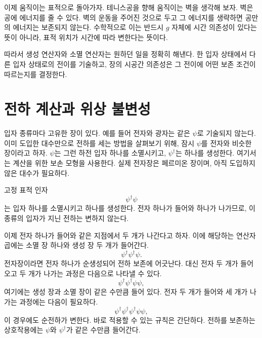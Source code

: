 \begin{classroomqa}
\end{classroomqa}

이제 움직이는 표적으로 돌아가자. 테니스공을 향해 움직이는 벽을 생각해 보자. 벽은 공에 에너지를 줄 수 있다. 벽의 운동을 주어진 것으로 두고 그 에너지를 생략하면 공만의 에너지는 보존되지 않는다. 수학적으로 이는 반드시 \(g\) 자체에 시간 의존성이 있다는 뜻이 아니라, 표적 위치가 시간에 따라 변한다는 뜻이다.

따라서 생성 연산자와 소멸 연산자는 원하던 일을 정확히 해낸다. 한 입자 상태에서 다른 입자 상태로의 전이를 기술하고, 장의 시공간 의존성은 그 전이에 어떤 보존 조건이 따르는지를 결정한다.

\section{전하 계산과 위상 불변성}

입자 종류마다 고유한 장이 있다. 예를 들어 전자와 광자는 같은 \(\psi\)로 기술되지 않는다. 이미 도입한 대수만으로 전하를 세는 방법을 살펴보기 위해, 잠시 \(\psi\)를 전자와 비슷한 장이라고 하자. \(\psi\)는 그런 하전 입자 하나를 소멸시키고, \(\psi^\dagger\)는 하나를 생성한다. 여기서는 계산을 위한 보손 모형을 사용한다. 실제 전자장은 페르미온 장이며, 아직 도입하지 않은 대수가 필요하다.

고정 표적 인자
\begin{equation}
\psi^\dagger\psi
\end{equation}
는 입자 하나를 소멸시키고 하나를 생성한다. 전자 하나가 들어와 하나가 나가므로, 이 종류의 입자가 지닌 전하는 변하지 않는다.

이제 전자 하나가 들어와 같은 지점에서 두 개가 나간다고 하자. 이에 해당하는 연산자 곱에는 소멸 장 하나와 생성 장 두 개가 들어간다.
\begin{equation}
\psi^\dagger\psi^\dagger\psi.
\end{equation}
전자장이라면 전자 하나가 순생성되어 전하 보존에 어긋난다. 대신 전자 두 개가 들어오고 두 개가 나가는 과정은 다음으로 나타낼 수 있다.
\begin{equation}
\psi^\dagger\psi^\dagger\psi\psi,
\end{equation}
여기에는 생성 장과 소멸 장이 같은 수만큼 들어 있다. 전자 두 개가 들어와 세 개가 나가는 과정에는 다음이 필요하다.
\begin{equation}
\psi^\dagger\psi^\dagger\psi^\dagger\psi\psi,
\end{equation}
이 경우에도 순전하가 변한다. 바로 적용할 수 있는 규칙은 간단하다. 전하를 보존하는 상호작용에는 \(\psi\)와 \(\psi^\dagger\)가 같은 수만큼 들어간다.


